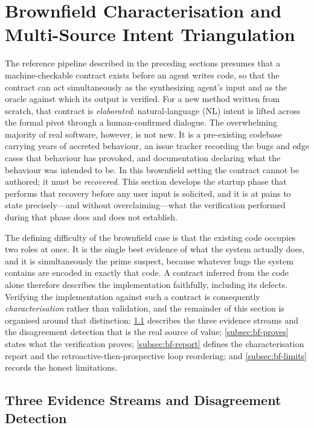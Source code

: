 \section{Brownfield Characterisation and Multi-Source Intent Triangulation}
\label{sec:brownfield}

The reference pipeline described in the preceding sections presumes that a machine-checkable contract exists before an agent writes code, so that the contract can act simultaneously as the synthesizing agent's input and as the oracle against which its output is verified. For a new method written from scratch, that contract is \emph{elaborated}: natural-language (NL) intent is lifted across the formal pivot through a human-confirmed dialogue. The overwhelming majority of real software, however, is not new. It is a pre-existing codebase carrying years of accreted behaviour, an issue tracker recording the bugs and edge cases that behaviour has provoked, and documentation declaring what the behaviour was intended to be. In this brownfield setting the contract cannot be authored; it must be \emph{recovered}. This section develops the startup phase that performs that recovery before any user input is solicited, and it is at pains to state precisely---and without overclaiming---what the verification performed during that phase does and does not establish.

The defining difficulty of the brownfield case is that the existing code occupies two roles at once. It is the single best evidence of what the system actually does, and it is simultaneously the prime suspect, because whatever bugs the system contains are encoded in exactly that code. A contract inferred from the code alone therefore describes the implementation faithfully, including its defects. Verifying the implementation against such a contract is consequently \emph{characterisation} rather than validation, and the remainder of this section is organised around that distinction: \cref{subsec:bf-streams} describes the three evidence streams and the disagreement detection that is the real source of value; \cref{subsec:bf-proves} states what the verification proves; \cref{subsec:bf-report} defines the characterisation report and the retroactive-then-prospective loop reordering; and \cref{subsec:bf-limits} records the honest limitations.

\subsection{Three Evidence Streams and Disagreement Detection}
\label{subsec:bf-streams}

